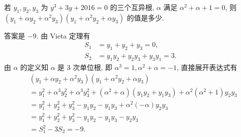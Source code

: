 \begin{prob}
\label{prob:prob-5}
若 $y_1, y_2, y_3$ 为 $y^3 + 3y + 2016 = 0$ 的三个互异根,
$\alpha$ 满足 $\alpha^2 + \alpha + 1 = 0$, 则
$(y_1 + \alpha y_2 + \alpha^2 y_3)(y_1 + \alpha^2 y_2 + \alpha y_3)$
的值是多少.
\end{prob}

\begin{soln}
答案是 $\boxed{-9.}$ 由 Vieta 定理有
\begin{align*}
  S_1 &= y_1 + y_2 + y_3 = 0,\\
  S_2 &= y_1y_2 + y_2y_3 + y_3y_1 = 3.
\end{align*}
由 $\alpha$ 的定义知 $\alpha$ 是 $3$ 次单位根,
即 $\alpha^3 = 1, \alpha^2 + \alpha = -1$, 直接展开表达式有
\begin{align*}
&(y_1 + \alpha y_2 + \alpha^2 y_3)(y_1 + \alpha^2 y_2 + \alpha y_3)\\
&= y_1^2 + \alpha^3y_2^2 + \alpha^3y_3^2 + (\alpha^2 + \alpha)(y_1y_2 + y_1y_3)
+ \alpha^2(\alpha^2 + 1)y_2y_3\\
&=y_1^2 + y_2^2 + y_3^2 - y_1y_2 - y_1y_3 + \alpha^2(-\alpha)y_2y_3\\
&=y_1^2 + y_2^2 + y_3^2 - y_1y_2 - y_1y_3 - y_2y_3\\
&=S_1^2 - 3S_2 = -9.
\end{align*}
\end{soln}
